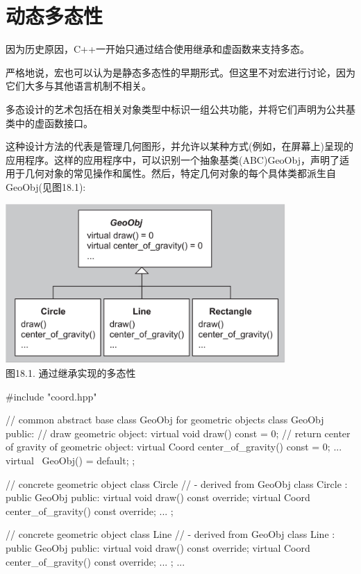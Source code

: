 \section{动态多态性}

因为历史原因，C++一开始只通过结合使用继承和虚函数来支持多态。

\begin{notice}
严格地说，宏也可以认为是静态多态性的早期形式。但这里不对宏进行讨论，因为它们大多与其他语言机制不相关。
\end{notice}

多态设计的艺术包括在相关对象类型中标识一组公共功能，并将它们声明为公共基类中的虚函数接口。

这种设计方法的代表是管理几何图形，并允许以某种方式(例如，在屏幕上)呈现的应用程序。这样的应用程序中，可以识别一个抽象基类(ABC)GeoObj，声明了适用于几何对象的常见操作和属性。然后，特定几何对象的每个具体类都派生自GeoObj(见图18.1):

\begin{center}
\includegraphics[width=0.8\textwidth]{part3/ch18/images/1.png} \\
图18.1. 通过继承实现的多态性
\end{center}

\begin{cpp}
#include "coord.hpp"

// common abstract base class GeoObj for geometric objects
class GeoObj {
	public:
	// draw geometric object:
	virtual void draw() const = 0;
	// return center of gravity of geometric object:
	virtual Coord center_of_gravity() const = 0;
	...
	virtual ~GeoObj() = default;
};

// concrete geometric object class Circle
// - derived from GeoObj
class Circle : public GeoObj {
	public:
	virtual void draw() const override;
	virtual Coord center_of_gravity() const override;
	...
};

// concrete geometric object class Line
// - derived from GeoObj
class Line : public GeoObj {
	public:
	virtual void draw() const override;
	virtual Coord center_of_gravity() const override;
	...
};
...
\end{cpp}


